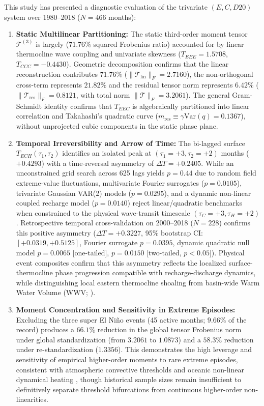 \documentclass[11pt,a4paper]{article}
\begin{document}
This study has presented a diagnostic evaluation of the trivariate $(E, C, D20)$ system over 1980--2018 ($N = 466$ months):
\begin{enumerate}
    \item \textbf{Static Multilinear Partitioning:} The static third-order moment tensor $\mathcal{T}^{(3)}$ is largely ($71.76\%$ squared Frobenius ratio) accounted for by linear thermocline wave coupling and univariate skewness ($T_{EEE} = 1.5708$, $T_{CCC} = -0.4430$). Geometric decomposition confirms that the linear reconstruction contributes $71.76\%$ ($\|\mathcal{T}_{\text{lin}}\|_F = 2.7160$), the non-orthogonal cross-term represents $21.82\%$ and the residual tensor norm represents $6.42\%$ ($\|\mathcal{T}_{\text{res}}\|_F = 0.8121$, with total norm $\|\mathcal{T}\|_F = 3.2061$). The general Gram-Schmidt identity confirms that $T_{EEC}$ is algebraically partitioned into linear correlation and Takahashi's quadratic curve ($m_{\text{res}} \equiv \gamma \text{Var}(q) = 0.1367$), without unprojected cubic components in the static phase plane.
    \item \textbf{Temporal Irreversibility and Arrow of Time:} The bi-lagged surface $T_{ECH}(\tau_1, \tau_2)$ identifies an isolated peak at $(\tau_1 = +3, \tau_2 = +2)$ months ($+0.4293$) with a time-reversal asymmetry of $\Delta T = +0.2405$. While an unconstrained grid search across 625 lags yields $p = 0.44$ due to random field extreme-value fluctuations, multivariate Fourier surrogates ($p = 0.0105$), trivariate Gaussian VAR(2) models ($p = 0.0295$), and a dynamic non-linear coupled recharge model ($p = 0.0140$) reject linear/quadratic benchmarks when constrained to the physical wave-transit timescale $(\tau_C = +3, \tau_H = +2)$. Retrospective temporal cross-validation on 2000--2018 ($N=228$) confirms this positive asymmetry ($\Delta T = +0.3227$, 95\% bootstrap CI: $[+0.0319, +0.5125]$, Fourier surrogate $p = 0.0395$, dynamic quadratic null model $p = 0.0065$ [one-tailed], $p=0.0150$ [two-tailed, $p < 0.05$]). Physical event composites confirm that this asymmetry reflects the localized surface-thermocline phase progression compatible with recharge-discharge dynamics, while distinguishing local eastern thermocline shoaling from basin-wide Warm Water Volume (WWV; \citealt{jin1997paradigm, vialard2025recharge}).
    \item \textbf{Moment Concentration and Sensitivity in Extreme Episodes:} Excluding the three super El Ni\~no events (45 active months; $9.66\%$ of the record) produces a $66.1\%$ reduction in the global tensor Frobenius norm under global standardization (from $3.2061$ to $1.0873$) and a $58.3\%$ reduction under re-standardization ($1.3356$). This demonstrates the high leverage and sensitivity of empirical higher-order moments to rare extreme episodes, consistent with atmospheric convective thresholds \citep{takahashi2016strong, takahashi2019theoretical} and oceanic non-linear dynamical heating \citep{an2004nonlinearity}, though historical sample sizes remain insufficient to definitively separate threshold bifurcations from continuous higher-order non-linearities.

\end{enumerate}
\end{document}
